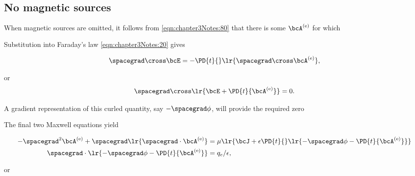 %
%

\subsection{No magnetic sources}

When magnetic sources are omitted, it follows from \cref{eqn:chapter3Notes:80} that there is some \( \bcA^\e \) for which


Substitution into Faraday's law \cref{eqn:chapter3Notes:20} gives

\begin{equation}\label{eqn:potentialMethods:40}
\spacegrad \cross \bcE = - \PD{t}{}\lr{ \spacegrad \cross \bcA^\e },
\end{equation}

or
\begin{equation}\label{eqn:potentialMethods:60}
\spacegrad \cross \lr{ \bcE + \PD{t}{ \bcA^\e } } = 0.
\end{equation}

A gradient representation of this curled quantity, say \( -\spacegrad \phi \), will provide the required zero


The final two Maxwell equations yield

\begin{equation}\label{eqn:potentialMethods:100}
\begin{aligned}
-\spacegrad^2 \bcA^\e + \spacegrad \lr{ \spacegrad \cdot \bcA^\e } &= \mu \lr{ \bcJ + \epsilon \PD{t}{} \lr{ -\spacegrad \phi -\PD{t}{ \bcA^\e } } } \\
\spacegrad \cdot \lr{ -\spacegrad \phi -\PD{t}{ \bcA^\e } } &= q_e/\epsilon,
\end{aligned}
\end{equation}

or

